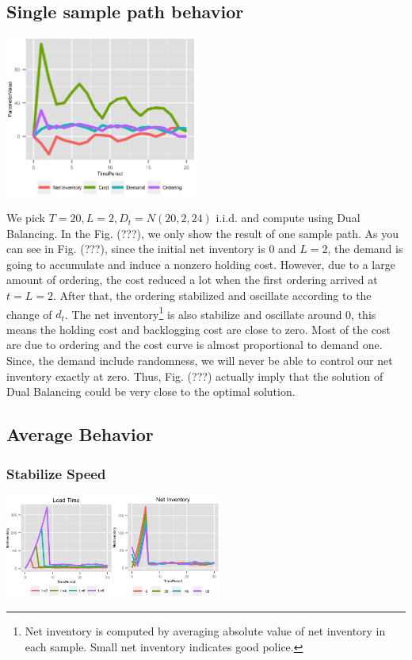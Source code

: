 \documentclass[twoside]{article}
\begin{document}
\begin{multicols}{2}
\subsection{Single sample path behavior}
\begin{center}
  \includegraphics[width=2.5in]{figures/DualBalancingParameters.png}
\end{center}

We pick $T=20,L=2,D_t=N(20,2,24)$ i.i.d. and compute using Dual Balancing. In the Fig. (???), we only show the result of one sample path. As you can see in Fig. (???), since the initial net inventory is 0 and $L=2$, the demand is going to accumulate and induce a nonzero holding cost. However, due to a large amount of ordering, the cost reduced a lot when the first ordering arrived at $t=L=2$. After that, the ordering stabilized and oscillate according to the change of $d_t$. The net inventory\footnote{Net inventory is computed by averaging absolute value of net inventory in each sample. Small net inventory indicates good police.} is also stabilize and oscillate around 0, this means the holding cost and backlogging cost are close to zero. Most of the cost are due to ordering and the cost curve is almost proportional to demand one.\\
Since, the demand include randomness, we will never be able to control our net inventory exactly at zero. Thus, Fig. (???) actually imply that the solution of Dual Balancing could be very close to the optimal solution.
\subsection{Average Behavior}

\subsubsection{Stabilize Speed}
\begin{center}
  \includegraphics[width=2.8in]{figures/NetInventoryLeadTime.png}
\end{center}


\end{multicols}
\end{document}
